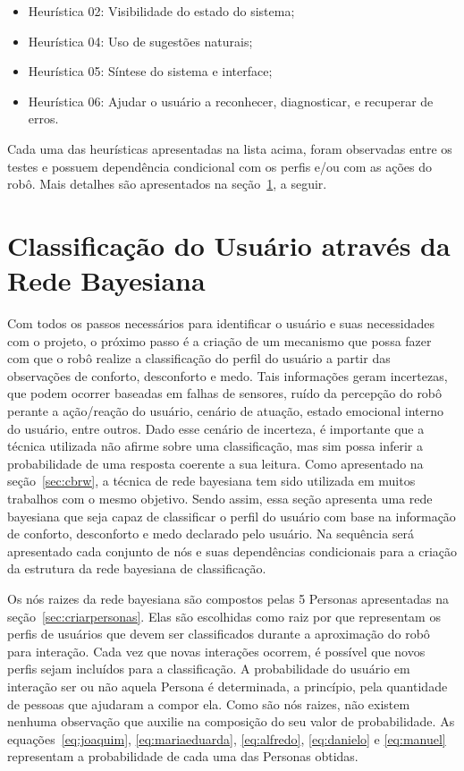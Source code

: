 \begin{itemize}
	\item Heurística 02: Visibilidade do estado do sistema;
	\item Heurística 04: Uso de sugestões naturais;
	\item Heurística 05: Síntese do sistema e interface;
	\item Heurística 06: Ajudar o usuário a reconhecer, diagnosticar, e recuperar de erros.
\end{itemize}

Cada uma das heurísticas apresentadas na lista acima, foram observadas entre os testes e possuem dependência condicional com os perfis e/ou com as ações do robô. Mais detalhes são apresentados na seção~\ref{sec:rede-bayesiana}, a seguir.

\section{Classificação do Usuário através da Rede Bayesiana}
\label{sec:rede-bayesiana}

Com todos os passos necessários para identificar o usuário e suas necessidades com o projeto, o próximo passo é a criação de um mecanismo que possa fazer com que o robô realize a classificação do perfil do usuário a partir das observações de conforto, desconforto e medo. Tais informações geram incertezas, que podem ocorrer baseadas em falhas de sensores, ruído da percepção do robô perante a ação/reação do usuário, cenário de atuação, estado emocional interno do usuário, entre outros. Dado esse cenário de incerteza, é importante que a técnica utilizada não afirme sobre uma classificação, mas sim possa inferir a probabilidade de uma resposta coerente a sua leitura. Como apresentado na seção~\ref{sec:cbrw}, a técnica de rede bayesiana tem sido utilizada em muitos trabalhos com o mesmo objetivo. Sendo assim, essa seção apresenta uma rede bayesiana que seja capaz de classificar o perfil do usuário com base na informação de conforto, desconforto e medo declarado pelo usuário. Na sequência será apresentado cada conjunto de nós e suas dependências condicionais para a criação da estrutura da rede bayesiana de classificação.

Os nós raizes da rede bayesiana são compostos pelas 5 Personas apresentadas na seção~\ref{sec:criarpersonas}. Elas são escolhidas como raiz por que representam os perfis de usuários que devem ser classificados durante a aproximação do robô para interação. Cada vez que novas interações ocorrem, é possível que novos perfis sejam incluídos para a classificação. A probabilidade do usuário em interação ser ou não aquela Persona é determinada, a princípio, pela quantidade de pessoas que ajudaram a compor ela. Como são nós raizes, não existem nenhuma observação que auxilie na composição do seu valor de probabilidade. As equações~\ref{eq:joaquim}, \ref{eq:mariaeduarda}, \ref{eq:alfredo}, \ref{eq:danielo} e \ref{eq:manuel} representam a probabilidade de cada uma das Personas obtidas.

